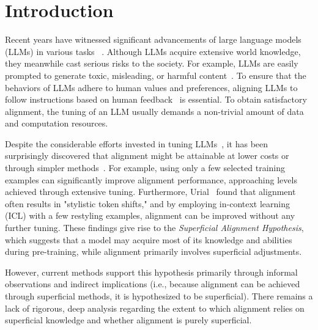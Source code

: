 
\section{Introduction}\label{sec:intro2}


Recent years have witnessed significant advancements of large language models (LLMs) in various tasks~\citep{hendrycks2021measuring,cobbe2021training,chen2021codex,welbl2017crowdsourcing}%
. Although LLMs acquire extensive world knowledge, they meanwhile cast serious risks to the society. For example, LLMs are easily prompted to generate toxic, misleading, or harmful content~\citep{wei2024jailbroken,zou2023universal,qi2023fine}. To ensure that the behaviors of LLMs adhere to human values and preferences, aligning LLMs to follow instructions based on human feedback~\cite{ipo,spin, rlhf, dpo, sppo} is essential. To obtain satisfactory alignment, the tuning of an LLM usually demands a non-trivial amount of data and computation resources.


Despite the considerable efforts invested in tuning LLMs~\citep{touvron2023llama,falcon}, it has been surprisingly discovered that alignment might be attainable at lower costs or through simpler methods~\citep{lima,chen2023alpagasus,lee2023platypus,urial}. For example, using only a few selected training examples can significantly improve alignment performance, approaching levels achieved through extensive tuning. Furthermore, Urial~\citep{urial} found that alignment often results in "stylistic token shifts," and by employing in-context learning (ICL)
\citep{brown2020language,wei2022chain} 
with a few restyling examples, alignment can be improved without any further tuning. These findings give rise to the \textit{Superficial Alignment Hypothesis}\citep{lima}, which suggests that a model may acquire most of its knowledge and abilities during pre-training, while alignment primarily involves superficial adjustments.

However, current methods support this hypothesis primarily through informal observations and indirect implications (i.e., because alignment can be achieved through superficial methods, it is hypothesized to be superficial). There remains a lack of rigorous, deep analysis regarding the extent to which alignment relies on superficial knowledge and whether alignment is purely superficial.

